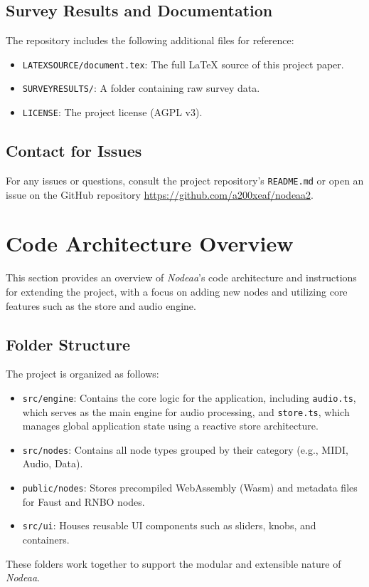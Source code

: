\documentclass[10pt,twocolumn]{article}
\begin{document}
\subsection{Survey Results and Documentation}

The repository includes the following additional files for reference:
\begin{itemize}
    \item \texttt{LATEXSOURCE/document.tex}: The full LaTeX source of this project paper.
    \item \texttt{SURVEYRESULTS/}: A folder containing raw survey data.
    \item \texttt{LICENSE}: The project license (AGPL v3).
\end{itemize}

\subsection{Contact for Issues}

For any issues or questions, consult the project repository's \texttt{README.md} or open an issue on the GitHub repository \url{https://github.com/a200xeaf/nodeaa2}.

\section{Code Architecture Overview}

This section provides an overview of \textit{Nodeaa}'s code architecture and instructions for extending the project, with a focus on adding new nodes and utilizing core features such as the store and audio engine.

\subsection{Folder Structure}
The project is organized as follows:
\begin{itemize}
    \item \texttt{src/engine}: Contains the core logic for the application, including \texttt{audio.ts}, which serves as the main engine for audio processing, and \texttt{store.ts}, which manages global application state using a reactive store architecture.
    \item \texttt{src/nodes}: Contains all node types grouped by their category (e.g., MIDI, Audio, Data).
    \item \texttt{public/nodes}: Stores precompiled WebAssembly (Wasm) and metadata files for Faust and RNBO nodes.
    \item \texttt{src/ui}: Houses reusable UI components such as sliders, knobs, and containers.
\end{itemize}
These folders work together to support the modular and extensible nature of \textit{Nodeaa}.
\end{document}
